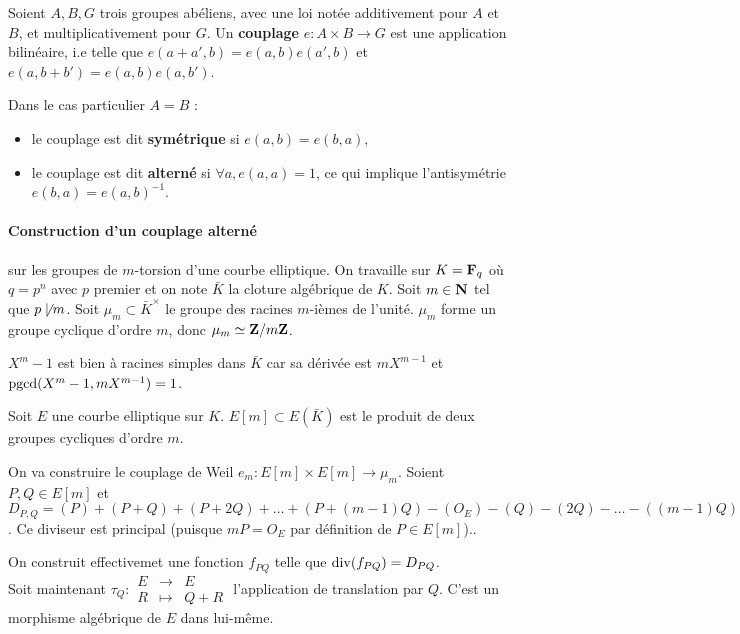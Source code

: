 	\begin{defn}
		Soient $A, B, G$ trois groupes abéliens, avec une loi notée additivement pour $A$ et $B$, et multiplicativement pour $G$.
		Un \textbf{couplage} $e \colon A \times B \to G$ est une application bilinéaire, i.e telle que $e(a + a',b) = e(a,b) e(a',b)$ et $e(a,b + b') = e(a,b) e(a,b')$.
		
		Dans le cas particulier $A = B$ :
		\begin{itemize}
			\item[\textbullet] le couplage est dit \textbf{symétrique} si $e(a,b) = e(b,a)$,
			\item[\textbullet] le couplage est dit \textbf{alterné} si $\forall a, e(a,a) = 1$, ce qui implique l'antisymétrie $e(b,a) = e(a,b)^{-1}$.
		\end{itemize}
	\end{defn}
	
	\paragraph{Construction d'un couplage alterné} sur les groupes de $m$-torsion d'une courbe elliptique.
	On travaille sur $K = \mathbf{F}_q$ où $q = p^n$ avec $p$ premier et on note $\bar K$ la cloture algébrique de $K$.
	Soit $m \in \mathbf{N}$ tel que $p \not\mid m$.
	Soit $\mu_m \subset \bar K^\times$ le groupe des racines $m$-ièmes de l'unité.
	$\mu_m$ forme un groupe cyclique d'ordre $m$, donc $\mu_m \simeq \mathbf{Z} / m\mathbf{Z}$.
	
	\begin{rem}
		$X^m - 1$ est bien à racines simples dans $\bar K$ car sa dérivée est $m X^{m - 1}$ et $\operatorname{pgcd}(X^m - 1, m X^{m - 1}) = 1$.
	\end{rem}
	
	Soit $E$ une courbe elliptique sur $K$.
	$E[m] \subset E(\bar K)$ est le produit de deux groupes cycliques d'ordre $m$.
	
	On va construire le couplage de Weil $e_m \colon E[m] \times E[m] \to \mu_m$.
	Soient $P,Q \in E[m]$ et $D_{P,Q} = (P) + (P + Q) + (P + 2Q) + \ldots + (P + (m-1)Q) - (O_E) - (Q) - (2Q) - \ldots - ((m-1)Q)$.
	Ce diviseur est principal (puisque $mP = O_E$ par définition de $P \in E[m]$)..
	
	On construit effectivemet une fonction $f_{PQ}$ telle que $\operatorname{div}(f_{PQ}) = D_{PQ}$.\\
	
	
	Soit maintenant  $\tau_Q \colon \begin{array}{lcr} E & \to & E \\ R & \mapsto & Q + R\end{array}$ l'application de translation par $Q$.
	C'est un morphisme algébrique de $E$ dans lui-même.
	
